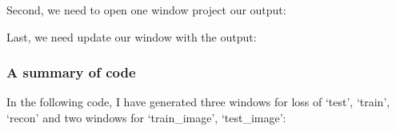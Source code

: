\documentclass[letterpaper,10pt,english]{sphinxmanual}
\begin{document}
Second, we need to open one window project our output:

%
\begin{sphinxVerbatim}[commandchars=\\\{\}]
  
\end{sphinxVerbatim}

Last, we need update our window with the output:

%
\begin{sphinxVerbatim}[commandchars=\\\{\}]
     
     
\end{sphinxVerbatim}


\subsubsection{A summary of code}
\label{\detokenize{usage/view:a-summary-of-code}}
In the following code, I have generated three windows for loss of ‘test’, ‘train’, ‘recon’ and two windows for ‘train\_image’, ‘test\_image’:
\end{document}
